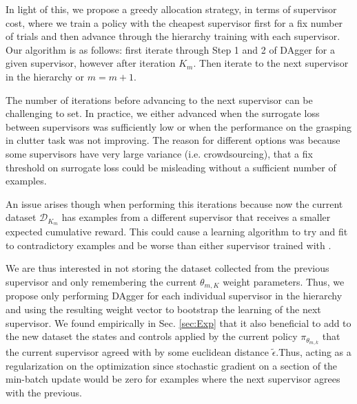 \documentclass[10pt, conference]{ieeeconf}      %
\begin{document}
 In light of this, we propose a greedy allocation strategy, in terms of supervisor cost, where we train a policy with the cheapest supervisor first for a fix number of trials and then advance through the hierarchy training with each supervisor. Our algorithm is as follows: first iterate through Step 1 and 2 of DAgger for a given supervisor, however after iteration $K_m$. Then iterate to the next supervisor in the hierarchy or $m = m+1$. 

The number of iterations before advancing to the next supervisor can be challenging to set. In practice, we either advanced when the surrogate loss between supervisors was sufficiently low or when the performance on the grasping in clutter task was not improving. The reason for different options was because some supervisors have very large variance (i.e. crowdsourcing), that a fix threshold on surrogate loss could be misleading without a sufficient number of examples. 

An issue arises though when performing this iterations because now the current dataset $\mathcal{D}_{K_m}$ has examples from a different supervisor that receives a smaller expected cumulative reward. This could cause a learning algorithm to try and fit to contradictory examples  and be worse than either supervisor trained with \cite{scholkopf2002learning}.

We are thus interested in not storing the dataset collected from the previous supervisor and only remembering the current $\theta_{m,K}$ weight parameters. Thus, we propose only performing DAgger for each individual supervisor in the hierarchy and using the resulting weight vector to bootstrap the learning of the next supervisor. We found empirically in Sec. \ref{sec:Exp} that it also beneficial to add to the new dataset the states and controls applied by the current policy $\pi_{\theta_{m,k}}$ that the current supervisor agreed with by some euclidean distance $\tilde{\epsilon}$.Thus, acting as a regularization on the optimization since stochastic gradient on a section of the min-batch update would be zero for examples where the next supervisor agrees with the previous. 
\end{document}
